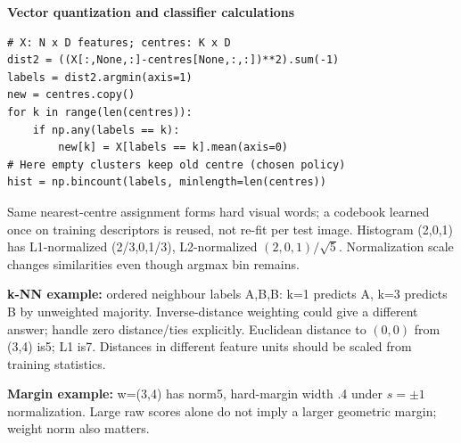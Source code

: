 \documentclass[a4paper]{article}
\newcommand{\key}[1]{\textbf{#1}}
\newcommand{\Topic}[1]{\par\vspace{1.7pt}\noindent
  {\fontsize{7.7}{8.0}\selectfont\bfseries #1}\par\vspace{0.3pt}}
\newcounter{sheet}
\newcounter{sheetcolumn}
\newlength{\colwidth}
\newenvironment{sheetcol}[1][7.0]{\stepcounter{sheetcolumn}
  \begin{lrbox}{\columnbox}\begin{minipage}[t]{\colwidth}\vspace{0pt}
  \fontsize{#1}{\dimexpr#1pt+0.6pt\relax}\selectfont}
  {\end{minipage}\end{lrbox}
  \typeout{CV1COL|\thesheet|\thesheetcolumn|\the\dimexpr\ht\columnbox+\dp\columnbox\relax}
  \usebox{\columnbox}\ignorespacesafterend}
\newcommand{\Sep}{\hfill}
\begin{document}
\begin{sheetcol}
\Topic{Vector quantization and classifier calculations}
\begin{lstlisting}
# X: N x D features; centres: K x D
dist2 = ((X[:,None,:]-centres[None,:,:])**2).sum(-1)
labels = dist2.argmin(axis=1)
new = centres.copy()
for k in range(len(centres)):
    if np.any(labels == k):
        new[k] = X[labels == k].mean(axis=0)
# Here empty clusters keep old centre (chosen policy)
hist = np.bincount(labels, minlength=len(centres))
\end{lstlisting}
Same nearest-centre assignment forms hard visual words; a codebook learned once on training descriptors is reused, not re-fit per test image. Histogram (2,0,1) has L1-normalized (2/3,0,1/3), L2-normalized \((2,0,1)/\sqrt5\). Normalization scale changes similarities even though argmax bin remains.

\key{k-NN example:} ordered neighbour labels A,B,B: k=1 predicts A, k=3 predicts B by unweighted majority. Inverse-distance weighting could give a different answer; handle zero distance/ties explicitly. Euclidean distance to \((0,0)\) from (3,4) is5; L1 is7. Distances in different feature units should be scaled from training statistics.

\key{Margin example:} w=(3,4) has norm5, hard-margin width .4 under \(s=\pm1\) normalization. Large raw scores alone do not imply a larger geometric margin; weight norm also matters.
\end{sheetcol}\Sep
\end{document}
